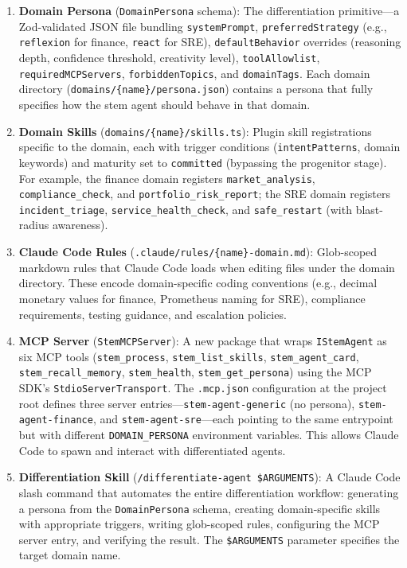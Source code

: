 \documentclass{article}
\begin{document}
\begin{enumerate}
\item \textbf{Domain Persona} (\texttt{DomainPersona} schema): The differentiation primitive---a Zod-validated JSON file bundling \texttt{systemPrompt}, \texttt{preferredStrategy} (e.g., \texttt{reflexion} for finance, \texttt{react} for SRE), \texttt{defaultBehavior} overrides (reasoning depth, confidence threshold, creativity level), \texttt{toolAllowlist}, \texttt{requiredMCPServers}, \texttt{forbiddenTopics}, and \texttt{domainTags}. Each domain directory (\texttt{domains/\{name\}/persona.json}) contains a persona that fully specifies how the stem agent should behave in that domain.

\item \textbf{Domain Skills} (\texttt{domains/\{name\}/skills.ts}): Plugin skill registrations specific to the domain, each with trigger conditions (\texttt{intentPatterns}, domain keywords) and maturity set to \texttt{committed} (bypassing the progenitor stage). For example, the finance domain registers \texttt{market\_analysis}, \texttt{compliance\_check}, and \texttt{portfolio\_risk\_report}; the SRE domain registers \texttt{incident\_triage}, \texttt{service\_health\_check}, and \texttt{safe\_restart} (with blast-radius awareness).

\item \textbf{Claude Code Rules} (\texttt{.claude/rules/\{name\}-domain.md}): Glob-scoped markdown rules that Claude Code loads when editing files under the domain directory. These encode domain-specific coding conventions (e.g., decimal monetary values for finance, Prometheus naming for SRE), compliance requirements, testing guidance, and escalation policies.

\item \textbf{MCP Server} (\texttt{StemMCPServer}): A new package that wraps \texttt{IStemAgent} as six MCP tools (\texttt{stem\_process}, \texttt{stem\_list\_skills}, \texttt{stem\_agent\_card}, \texttt{stem\_recall\_memory}, \texttt{stem\_health}, \texttt{stem\_get\_persona}) using the MCP SDK's \texttt{StdioServerTransport}. The \texttt{.mcp.json} configuration at the project root defines three server entries---\texttt{stem-agent-generic} (no persona), \texttt{stem-agent-finance}, and \texttt{stem-agent-sre}---each pointing to the same entrypoint but with different \texttt{DOMAIN\_PERSONA} environment variables. This allows Claude Code to spawn and interact with differentiated agents.

\item \textbf{Differentiation Skill} (\texttt{/differentiate-agent \$ARGUMENTS}): A Claude Code slash command that automates the entire differentiation workflow: generating a persona from the \texttt{DomainPersona} schema, creating domain-specific skills with appropriate triggers, writing glob-scoped rules, configuring the MCP server entry, and verifying the result. The \texttt{\$ARGUMENTS} parameter specifies the target domain name.
\end{enumerate}
\end{document}
